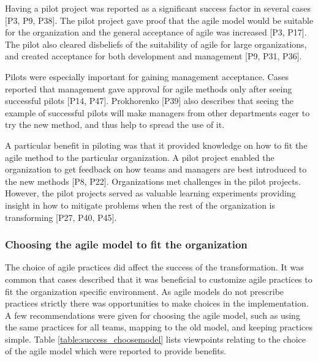 \documentclass[preprint,authoryear,12pt]{elsarticle}
\begin{document}

Having a pilot project was reported as a significant success factor in several
cases [P3, P9, P38].
The pilot project gave proof that the agile model would be suitable for the
organization and the general acceptance of agile was increased [P3, P17].
The pilot also cleared disbeliefs of the suitability of agile for large
organizations, and created acceptance for both development and management [P9,
P31, P36].

Pilots were especially important for gaining management acceptance. Cases
reported that management gave approval for agile methods only after seeing
successful pilots [P14, P47]. Prokhorenko [P39] also describes that seeing the
example of successful pilots will make managers from other departments eager to
try the new method, and thus help to spread the use of it.


A particular benefit in piloting was that it provided knowledge on how to fit
the agile method to the particular organization.
A pilot project enabled the organization to get feedback on how teams and
managers are best introduced to the new methods [P8, P22].
Organizations met challenges in the pilot projects. However, the pilot projects
served as valuable learning experiments providing insight in how to mitigate
problems when the rest of the organization is transforming [P27, P40, P45].


\subsubsection{Choosing the agile model to fit the organization}

The choice of agile practices did affect the success of the transformation. It
was common that cases described that it was beneficial to customize agile
practices to fit the organization specific environment. As agile models do not
prescribe practices strictly there was opportunities to make choices in the
implementation. A few recommendations were given for choosing the agile model,
such as using the same practices for all teams, mapping to the old model, and
keeping practices simple. Table \ref{table:success_choosemodel} lists viewpoints
relating to the choice of the agile model which were reported to provide
benefits.
\end{document}

